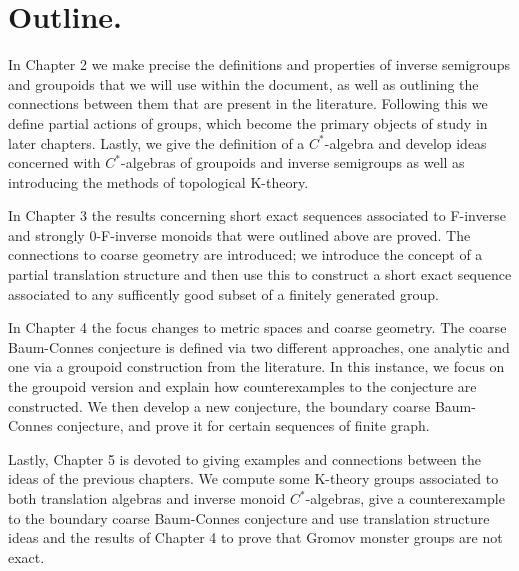 \section{Outline.}

In Chapter 2 we make precise the definitions and properties of inverse semigroups and groupoids that we will use within the document, as well as outlining the connections between them that are present in the literature. Following this we define partial actions of groups, which become the primary objects of study in later chapters. Lastly, we give the definition of a $C^{*}$-algebra and develop ideas concerned with $C^{*}$-algebras of groupoids and inverse semigroups as well as introducing the methods of topological K-theory.

In Chapter 3 the results concerning short exact sequences associated to F-inverse and strongly 0-F-inverse monoids that were outlined above are proved. The connections to coarse geometry are introduced; we introduce the concept of a partial translation structure and then use this to construct a short exact sequence associated to any sufficently good subset of a finitely generated group. 

In Chapter 4 the focus changes to metric spaces and coarse geometry. The coarse Baum-Connes conjecture is defined via two different approaches, one analytic and one via a groupoid construction from the literature. In this instance, we focus on the groupoid version and explain how counterexamples to the conjecture are constructed. We then develop a new conjecture, the boundary coarse Baum-Connes conjecture, and prove it for certain sequences of finite graph.

Lastly, Chapter 5 is devoted to giving examples and connections between the ideas of the previous chapters. We compute some K-theory groups associated to both translation algebras and inverse monoid $C^{*}$-algebras, give a counterexample to the boundary coarse Baum-Connes conjecture and use translation structure ideas and the results of Chapter 4 to prove that Gromov monster groups are not exact.

